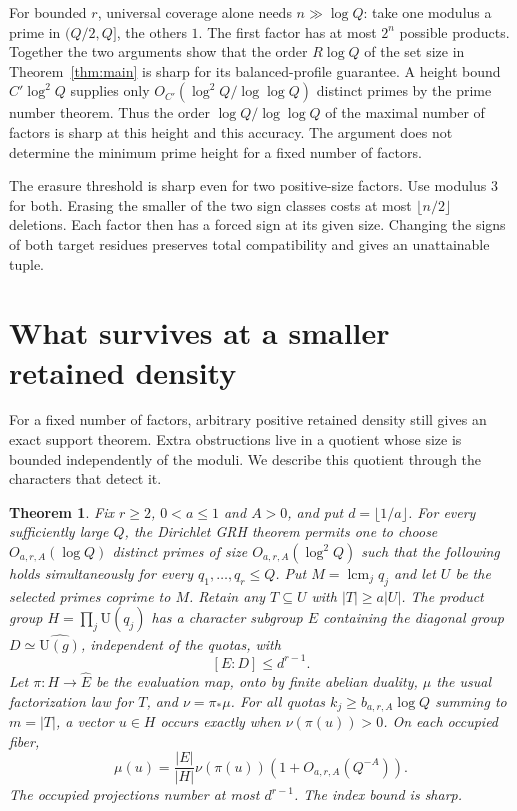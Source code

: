 \documentclass[11pt]{article}
\newtheorem{theorem}{Theorem}[section]
\newcommand{\U}{\mathrm U}
\begin{document}
For bounded $r$, universal coverage alone needs $n\gg\log Q$: take one modulus a prime in $(Q/2,Q]$, the others $1$. The first factor has at most $2^n$ possible products. Together the two arguments show that the order $R\log Q$ of the set size in Theorem~\ref{thm:main} is sharp for its balanced-profile guarantee. A height bound $C'\log^2 Q$ supplies only $O_{C'}(\log^2 Q/\log\log Q)$ distinct primes by the prime number theorem. Thus the order $\log Q/\log\log Q$ of the maximal number of factors is sharp at this height and this accuracy. The argument does not determine the minimum prime height for a fixed number of factors.

The erasure threshold is sharp even for two positive-size factors. Use modulus $3$ for both. Erasing the smaller of the two sign classes costs at most $\lfloor n/2\rfloor$ deletions. Each factor then has a forced sign at its given size. Changing the signs of both target residues preserves total compatibility and gives an unattainable tuple.

\section{What survives at a smaller retained density}\label{sec:minority}
For a fixed number of factors, arbitrary positive retained density still gives an exact support theorem. Extra obstructions live in a quotient whose size is bounded independently of the moduli. We describe this quotient through the characters that detect it.

\begin{theorem}\label{thm:minority}
Fix $r\ge2$, $0<a\le1$ and $A>0$, and put $d=\lfloor 1/a\rfloor$. For every sufficiently large $Q$, the Dirichlet GRH theorem permits one to choose $O_{a,r,A}(\log Q)$ distinct primes of size $O_{a,r,A}(\log^2 Q)$ such that the following holds simultaneously for every $q_1,\ldots,q_r\le Q$. Put $M=\operatorname{lcm}_j q_j$ and let $U$ be the selected primes coprime to $M$. Retain any $T\subseteq U$ with $|T|\ge a|U|$. The product group $H=\prod_j\U(q_j)$ has a character subgroup $E$ containing the diagonal group $D\simeq\widehat{\U(g)}$, independent of the quotas, with
\[
 [E:D]\le d^{r-1}.
\]
Let $\pi:H\to\widehat E$ be the evaluation map, onto by finite abelian duality, $\mu$ the usual factorization law for $T$, and $\nu=\pi_*\mu$. For all quotas $k_j\ge b_{a,r,A}\log Q$ summing to $m=|T|$, a vector $u\in H$ occurs exactly when $\nu(\pi(u))>0$. On each occupied fiber,
\[
 \mu(u)=\frac{|E|}{|H|}\nu(\pi(u))(1+O_{a,r,A}(Q^{-A})).
\]
The occupied projections number at most $d^{r-1}$. The index bound is sharp.
\end{theorem}
\end{document}
